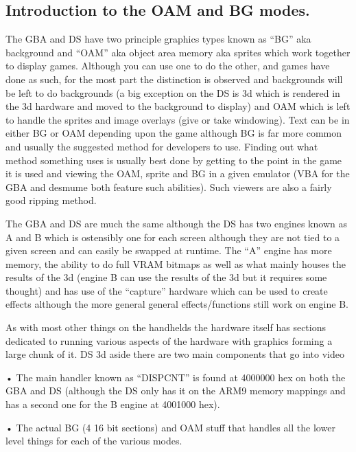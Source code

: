 \documentclass[
]{book}
\begin{document}
\hypertarget{introduction-to-the-oam-and-bg-modes.}{%
\subsection{Introduction to the OAM and BG modes.}\label{introduction-to-the-oam-and-bg-modes.}}

The GBA and DS have two principle graphics types known as ``BG'' aka background and ``OAM'' aka object area memory aka sprites which work together to display games. Although you can use one to do the other, and games have done as such, for the most part the distinction is observed and backgrounds will be left to do backgrounds (a big exception on the DS is 3d which is rendered in the 3d hardware and moved to the background to display) and OAM which is left to handle the sprites and image overlays (give or take windowing). Text can be in either BG or OAM depending upon the game although BG is far more common and usually the suggested method for developers to use. Finding out what method something uses is usually best done by getting to the point in the game it is used and viewing the OAM, sprite and BG in a given emulator (VBA for the GBA and desmume both feature such abilities). Such viewers are also a fairly good ripping method.

The GBA and DS are much the same although the DS has two engines known as A and B which is ostensibly one for each screen although they are not tied to a given screen and can easily be swapped at runtime. The ``A'' engine has more memory, the ability to do full VRAM bitmaps as well as what mainly houses the results of the 3d (engine B can use the results of the 3d but it requires some thought) and has use of the ``capture'' hardware which can be used to create effects although the more general general effects/functions still work on engine B.

As with most other things on the handhelds the hardware itself has sections dedicated to running various aspects of the hardware with graphics forming a large chunk of it. DS 3d aside there are two main components that go into video

• The main handler known as ``DISPCNT'' is found at 4000000 hex on both the GBA and DS (although the DS only has it on the ARM9 memory mappings and has a second one for the B engine at 4001000 hex).

• The actual BG (4 16 bit sections) and OAM stuff that handles all the lower level things for each of the various modes.
\end{document}
